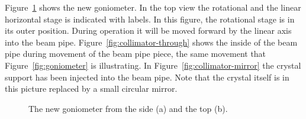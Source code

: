 Figure~\ref{fig:collimator} shows the new goniometer. In the top view the rotational and the linear horizontal stage is indicated with labels. In this figure, the rotational stage is in its outer position. During operation it will be moved forward by the linear axis into the beam pipe. Figure~\ref{fig:collimator-through} shows the inside of the beam pipe during movement of the beam pipe piece, the same movement that Figure~\ref{fig:goniometer} is illustrating. In Figure~\ref{fig:collimator-mirror} the crystal support has been injected into the beam pipe. Note that the crystal itself is in this picture replaced by a small circular mirror.

\begin{figure}[tpb]
  \centering %
  \qquad
  \caption{\label{fig:collimator} The new goniometer from the side (a) and the top (b).}
\end{figure}

